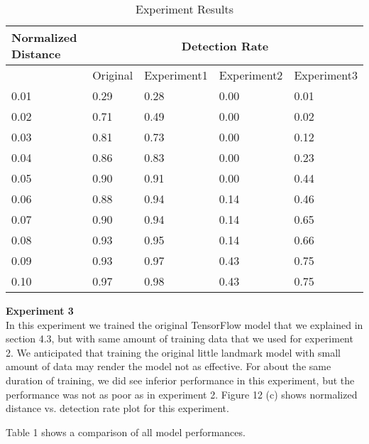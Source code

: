 \documentclass [11pt,letterpaper ,twoside ,openany ]{report}
\begin{document}
    \begin{wraptable}{r}{0.55\textwidth}
    \centering
    \tiny
    \begin{tabular}{ | p{1.4cm} | p{1.4cm} | p{1.4cm} | p{1.4cm} |  p{1.4cm}| }
    \hline
    Normalized Distance &  \multicolumn{4}{|c|}{Detection Rate} \\ \hline
    & Original & Experiment1 & Experiment2 & Experiment3 \\ \hline
    0.01 &  0.29 & 0.28 & 0.00 & 0.01 \\ \hline
    0.02 & 0.71 & 0.49 & 0.00 & 0.02 \\ \hline
    0.03 & 0.81 & 0.73 & 0.00 & 0.12 \\ \hline
    0.04 & 0.86 & 0.83 & 0.00 & 0.23 \\ \hline
    0.05 & 0.90 & 0.91 & 0.00 & 0.44 \\ \hline
    0.06 & 0.88 & 0.94 & 0.14 & 0.46 \\ \hline
    0.07 & 0.90 & 0.94 & 0.14 & 0.65 \\ \hline
    0.08 & 0.93 & 0.95 & 0.14 & 0.66 \\ \hline
    0.09 & 0.93 & 0.97 & 0.43 & 0.75 \\ \hline
    0.10 & 0.97 & 0.98 & 0.43 & 0.75 \\ \hline

    \end{tabular}
    \caption{Experiment Results}
    \label{table:exp}
    \end{wraptable}    

    \noindent
    \textbf{Experiment 3}\\             
    In this experiment we trained the original TensorFlow model that we explained in section 4.3, but with same amount of training data that we used for experiment 2. We anticipated that training the original little landmark model with small amount of data may render the model not as effective. For about the same duration of training, we did see inferior performance in this experiment, but the performance was not as poor as in experiment 2. Figure 12 (c) shows normalized distance vs. detection rate plot for this experiment. 

    Table 1 shows a comparison of all model performances.\\
\end{document}
